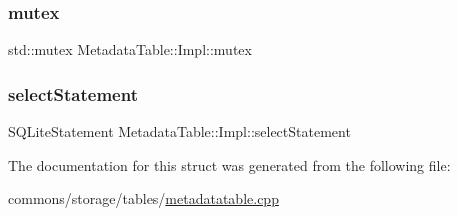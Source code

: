 \mbox{\label{struct_metadata_table_1_1_impl_a68358a10929b133fcffa243a8521bc87}} 
\subsubsection{\texorpdfstring{mutex}{mutex}}
{\footnotesize\ttfamily std\+::mutex Metadata\+Table\+::\+Impl\+::mutex}

\mbox{\label{struct_metadata_table_1_1_impl_ac28b3baeed0ac96546d1f08e7f5f07b2}} 
\subsubsection{\texorpdfstring{selectStatement}{selectStatement}}
{\footnotesize\ttfamily S\+Q\+Lite\+Statement Metadata\+Table\+::\+Impl\+::select\+Statement}



The documentation for this struct was generated from the following file\+:\begin{DoxyCompactItemize}
\item 
commons/storage/tables/\mbox{\hyperlink{metadatatable_8cpp}{metadatatable.\+cpp}}\end{DoxyCompactItemize}

